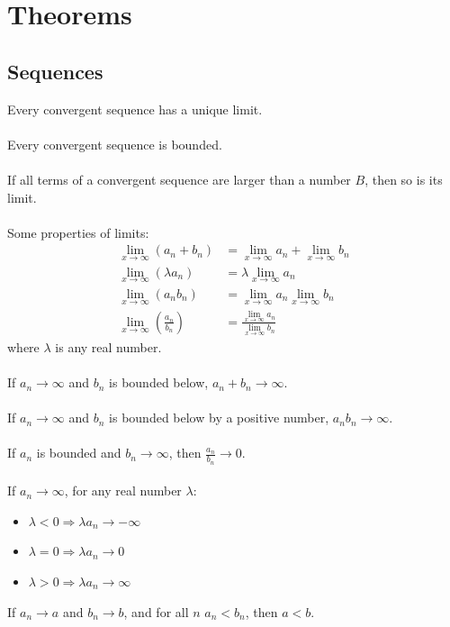 \documentclass{article}
\begin{document}
\section{Theorems}
\subsection{Sequences}
Every convergent sequence has a unique limit.
\\\\
Every convergent sequence is bounded.
\\\\
If all terms of a convergent sequence are larger than a number $ B $, then so is its limit.
\\\\
Some properties of limits:
\begin{align}
\lim_{x \to \infty}(a_{n} + b_{n}) & = \lim_{x \to \infty} a_{n} + \lim_{x \to \infty} b_{n} \\
\lim_{x \to \infty}(\lambda a_{n}) & = \lambda\lim_{x \to \infty} a_{n} \\
\lim_{x \to \infty}(a_{n}b_{n}) & = \lim_{x \to \infty} a_{n}\lim_{x \to \infty} b_{n} \\
\lim_{x \to \infty}(\frac{a_{n}}{b_{n}}) & = \frac{\lim_{x \to \infty} a_{n}}{\lim_{x \to \infty} b_{n}}
\end{align}
where $ \lambda $ is any real number.
\\\\
If $ a_{n} \to \infty $ and $ b_{n} $ is bounded below, $ a_{n} + b_{n} \to \infty $.
\\\\
If $ a_{n} \to \infty $ and $ b_{n} $ is bounded below by a positive number, $ a_{n}b_{n} \to \infty $.
\\\\
If $ a_{n} $ is bounded and $ b_{n} \to \infty $, then $ \frac{a_{n}}{b_{n}} \to 0 $.
\\\\
If $ a_{n} \to \infty $, for any real number $ \lambda $:
\begin{itemize}
\item $ \lambda < 0 \Rightarrow \lambda a_{n} \to -\infty $
\item $ \lambda = 0 \Rightarrow \lambda a_{n} \to 0 $
\item $ \lambda > 0 \Rightarrow \lambda a_{n} \to \infty $
\end{itemize}
If $ a_{n} \to a $ and $ b_{n} \to b $, and for all $ n $ $ a_{n} < b_{n} $, then $ a < b $.
\end{document}
